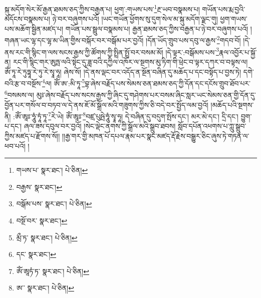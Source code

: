 སྐུ་མདོག་སེར་མོ་རྒྱན་ཐམས་ཅད་ཀྱིས་བརྒྱན་པ། ཕྱག་:གཡས་པས་\footnote{གཡས་པ་  སྣར་ཐང་།  པེ་ཅིན། }རྔ་ཡབ་བསྣམས་པ། གཡོན་པས་རྨ་བྱའི་མདོངས་བསྣམས་པ། ཉེ་བར་བཞུགས་པའོ། །ཡང་གཡོན་ཕྱོགས་སུ་དུག་སེལ་མ་སྐུ་མདོག་ལྗང་གུ། ཕྱག་གཡས་པས་མཆོག་སྦྱིན་མཛད་པ། གཡོན་པས་སྦྲུལ་བསྣམས་པ། རྒྱན་ཐམས་ཅད་ཀྱིས་བརྒྱན་པ་ཉེ་བར་བཞུགས་པའོ། །གཞན་ཡང་ལྷ་དང་ལྷ་མ་ཡིན་གྱིས་བསྐོར་བར་བསྒོམ་པར་བྱའོ། །དོན་ཡོད་གྲུབ་པས་དབུ་ལ་རྒྱས་\footnote{བརྒྱས་  སྣར་ཐང་། }གདབ་བོ། །དེ་ནས་རང་གི་སྙིང་ག་ལས་སངས་རྒྱས་ཀྱི་ཚོགས་ཀྱི་སྤྲིན་སྤྲོ་བར་བསམ་མོ། །དེ་ལྟར་:བསྒོམས་པས་\footnote{བསྒོམ་པས་  སྣར་ཐང་།  པེ་ཅིན། }རྣལ་འབྱོར་པ་སྐྱོ་ན། རང་གི་སྙིང་གར་ཨུཏྤ་ལའི་སྟེང་དུ་ཟླ་བའི་དཀྱིལ་འཁོར་ལ་སྔགས་མུ་ཏིག་གི་ཕྲེང་བ་ལྟར་དཀར་བ་བལྟས་ལ། ཨོཾ་ཏཱ་རེ་ཏུཏྟཱ་རེ་ཏུ་རེ་སྭཱ་ཧཱ། ཞེས་སོ། །དེ་ནས་ལྡང་བར་འདོད་ན་སྔོན་བཞིན་དུ་མཆོད་པ་དང་བསྟོད་པ་བྱས་ཏེ། དགེ་བའི་རྩ་བ་བསྔོས་\footnote{བསྔོ་བར་  སྣར་ཐང་། }ལ། ཨོཾ་ཨ་:མི་ཏཱ་\footnote{མྲྀ་ཏ་  སྣར་ཐང་།  པེ་ཅིན། }བྷ་ཞེས་བརྗོད་པས་སེམས་ཅན་ཐམས་ཅད་ཀྱི་དོན་དང་དངོས་གྲུབ་ཐོབ་པར་\footnote{དང་  སྣར་ཐང་། }བསམས་ལ། མུཿ་ཞེས་བརྗོད་པས་སངས་རྒྱས་ཀྱི་ཞིང་དུ་གཤེགས་པར་བསམ་ཞིང་སླར་ཡང་སེམས་ཅན་གྱི་དོན་དུ་བྱོན་པར་གསོལ་བ་བཏབ་ལ་དེ་ནས་ཇོ་མོ་སྒྲོལ་མའི་གཟུགས་ཀྱིས་ཅི་བདེ་བར་སྤྱོད་ལམ་བྱའོ། །མཆོད་པའི་སྔགས་ནི། :ཨོཾ་ཨཱཿ་ཧཱུཾ་ཏཱཾ་ཏཱ་\footnote{ཨོཾ་ཨཱཏཾ་ཏ་  སྣར་ཐང་།  པེ་ཅིན། }རེ་ཡེ། ཨོཾ་ཨཱཿ་\footnote{ཨ་་  སྣར་ཐང་།  པེ་ཅིན། }བཛྲ་པུཥྤེ་ཧཱུཾ་སྭཱ་ཧཱ། དེ་བཞིན་དུ་བདུག་སྤོས་དང་། མར་མེ་དང་། དྲི་དང་། བྱུག་པ་དང་། ཞལ་ཟས་དབུལ་བར་བྱའོ། །སེང་ལྡེང་ནགས་ཀྱི་སྒྲོལ་མའི་སྒྲུབ་ཐབས། སློབ་དཔོན་འཕགས་པ་ཀླུ་སྒྲུབ་ཀྱིས་མཛད་པ་རྫོགས་སོ།། །།རྒྱ་གར་གྱི་མཁན་པོ་དཔལ་རྣམ་པར་སྣང་མཛད་རྡོ་རྗེས་བསྒྱུར་ཅིང་ཞུས་ཏེ་གཏན་ལ་ཕབ་པའོ། ། 